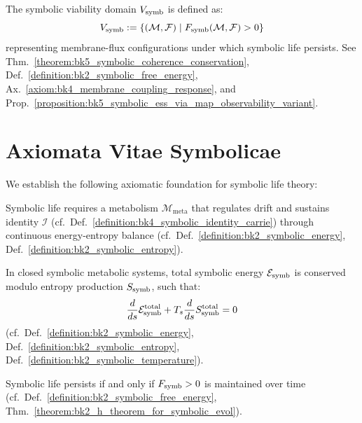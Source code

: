 \begin{definition}
\label{definition:bk5_viability_domain}
The symbolic viability domain $V_{\mathrm{symb}}$ is defined as:
\begin{equation}
V_{\mathrm{symb}} := \{ (\mathcal{M}, \mathcal{F}) \mid F_{\mathrm{symb}}(\mathcal{M}, \mathcal{F}) > 0 \}
\end{equation}
\noindent representing membrane-flux configurations under which symbolic life persists.
See Thm.~\ref{theorem:bk5_symbolic_coherence_conservation}, Def.~\ref{definition:bk2_symbolic_free_energy}, Ax.~\ref{axiom:bk4_membrane_coupling_response}, and Prop.~\ref{proposition:bk5_symbolic_ess_via_map_observability_variant}.
\end{definition}
\section{Axiomata Vitae Symbolicae}
\label{sec:bk5_axiomata_vitae_symbolicae}
We establish the following axiomatic foundation for symbolic life theory:

\begin{axiom}
\label{axiom:bk5_metabolic_persistence}
Symbolic life requires a metabolism $\mathcal{M}_{\mathrm{meta}}$ that regulates drift and sustains identity $\mathcal{I}$ (cf.~Def.~\ref{definition:bk4_symbolic_identity_carrie}) through continuous energy-entropy balance (cf.~Def.~\ref{definition:bk2_symbolic_energy}, Def.~\ref{definition:bk2_symbolic_entropy}).
\end{axiom}

\begin{axiom}
\label{axiom:bk5_energy_conservation}
In closed symbolic metabolic systems, total symbolic energy $\mathcal{E}_{\mathrm{symb}}$ is conserved modulo entropy production $S_{\mathrm{symb}}$, such that:
\begin{equation}
\frac{d}{ds}\mathcal{E}_{\mathrm{symb}}^{\mathrm{total}} + T_s\frac{d}{ds}S_{\mathrm{symb}}^{\mathrm{total}} = 0
\end{equation}
(cf.~Def.~\ref{definition:bk2_symbolic_energy}, Def.~\ref{definition:bk2_symbolic_entropy}, Def.~\ref{definition:bk2_symbolic_temperature}).
\end{axiom}

\begin{axiom}
\label{axiom:bk5_positive_free_energy}
Symbolic life persists if and only if $F_{\mathrm{symb}} > 0$ is maintained over time (cf.~Def.~\ref{definition:bk2_symbolic_free_energy}, Thm.~\ref{theorem:bk2_h_theorem_for_symbolic_evol}).
\end{axiom}

